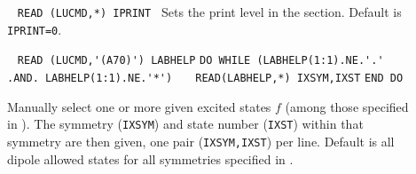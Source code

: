 \begin{description}
%
%
%
%
\item[] \verb| |\newline
\verb|READ (LUCMD,*) IPRINT |\newline
Sets the print level in the  section. Default is \verb+IPRINT=0+.
%
\item[] \verb| |\newline 
\verb|READ (LUCMD,'(A70)') LABHELP|\newline
\verb|DO WHILE (LABHELP(1:1).NE.'.' .AND. LABHELP(1:1).NE.'*')|\newline
\verb|   READ(LABHELP,*) IXSYM,IXST|\newline
\verb|END DO|

Manually select one or more given excited states $f$ (among those specified
in ). 
The symmetry (\verb+IXSYM+) and state number (\verb+IXST+)
within that symmetry are then given,
one pair (\verb|IXSYM,IXST|) per line.
Default is all dipole allowed states for all symmetries 
specified in .
%
%
%
%
%
%
%
\end{description}

